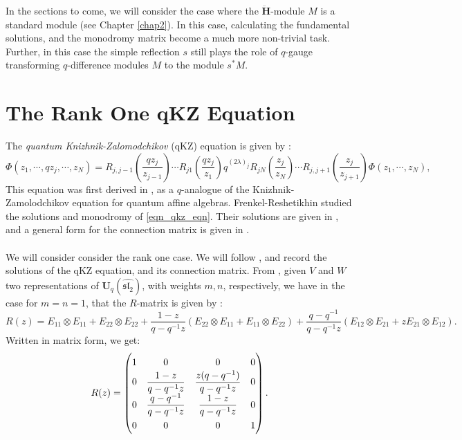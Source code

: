 \documentclass[a4paper]{report}
\theoremstyle{theorem}
\theoremstyle{definition}
\theoremstyle{remark}
\theoremstyle{proposition}
\theoremstyle{conjecture}
\theoremstyle{lemma}
\theoremstyle{corollary}
\theoremstyle{exercise}
\theoremstyle{example}
\begin{document}
  In the sections to come, we will consider the case where the $\mathbf{\ddot{\mathbf{H}}}$-module $M$ 
  is a standard module (see Chapter \ref{chap2}). In this case, 
  calculating the fundamental solutions, and the monodromy matrix become a much more non-trivial task.
  Further, in this case the simple reflection $s$ still plays the role of $q$-gauge 
  transforming $q$-difference modules $M$ to the module $s^\ast M$.
  
  \section{The Rank One qKZ Equation}
  
  The \emph{quantum Knizhnik-Zalomodchikov} (qKZ) equation 
  is given by \cite[Chapter 11.5, (11.27)]{efk98}: 
  \begin{equation}\label{eqn_qkz_eqn}
      \Phi(z_1,\cdots,qz_j,\cdots,z_N) = R_{j,j-1}\left(\frac{qz_j}{z_{j-1}}\right) \cdots R_{j1}\left(\frac{qz_j}{z_1}\right) q^{(2\lambda)_j} R_{jN}\left(\frac{z_j}{z_N}\right) \cdots R_{j,j+1}\left(\frac{z_j}{z_{j+1}}\right) \Phi(z_1,\cdots,z_N),
  \end{equation}
  This equation was first derived in \cite[Theorem 5.3]{fr92}, as a $q$-analogue of the 
  Knizhnik-Zamolodchikov equation for quantum affine algebras. Frenkel-Reshetikhin studied the 
  solutions and monodromy of \eqref{eqn_qkz_eqn}. Their solutions are given in \cite[Proposition 6.1]{fr92}, 
  and a general form for the connection matrix is given in \cite[(6.32)]{fr92}.\\\\
  We will consider consider the rank one case. We will follow \cite[\S 11, \S 12]{efk98}, and record 
  the solutions of the qKZ equation, and its connection matrix.
  From \cite[Example 9.6.5]{efk98}, given $V$ and $W$ two representations of 
  $\mathbf{U}_q(\widehat{\mathfrak{sl}_2})$, with weights $m,n$, respectively,
  we have in the case for $m=n=1$, that the $R$-matrix is given by 
  \cite[(9.41)]{efk98}:
  $$R(z) = E_{11}\otimes E_{11} + E_{22}\otimes E_{22} + \frac{1-z}{q-q^{-1}z}(E_{22}\otimes E_{11} + E_{11}\otimes E_{22}) + \frac{q-q^{-1}}{q-q^{-1}z}(E_{12}\otimes E_{21}+zE_{21}\otimes E_{12}).$$
  Written in matrix form, we get:
  $$R(z) = \renewcommand\arraystretch{1.5}\begin{pmatrix}
      1 & 0 & 0 & 0\\
      0 & \displaystyle\frac{1-z}{q-q^{-1}z} & \displaystyle\frac{z(q-q^{-1})}{q-q^{-1}z} & 0\\
      0 & \displaystyle\frac{q-q^{-1}}{q-q^{-1}z} & \displaystyle\frac{1-z}{q-q^{-1}z} & 0\\
      0 & 0 & 0 & 1
  \end{pmatrix}.$$
\end{document}
